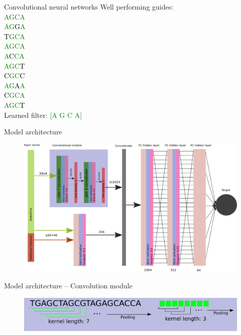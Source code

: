 \documentclass[Nike]{tuberlinbeamer}
\begin{document}
\begin{frame}{Convolutional neural networks}
  Well performing guides: \\
  \textcolor{green}{\large
    AGCA \\
    AG{\textcolor{black}G}A \\
    {\textcolor{black}T}GCA \\
    AGCA \\
    A{\textcolor{black}C}CA \\
    AGC{\textcolor{black}T} \\
    {\textcolor{black}C}GC{\textcolor{black}C} \\
    AG{\textcolor{black}A}A \\
    {\textcolor{black}C}GCA \\
    AGC{\textcolor{black}T} \\
  }
  \pause
  Learned filter: \textcolor{green}{[A G C A]}
\end{frame}

\begin{frame}{Model architecture}
  \begin{figure}
    \includegraphics[width=0.9\linewidth]{CNN38_layout.png}
  \end{figure}
\end{frame}

\begin{frame}{Model architecture -- Convolution module}
  \vspace{2.0cm}
  \begin{figure}
    \includegraphics[width=0.8\linewidth]{convolution.png}
  \end{figure}
\end{frame}
\end{document}
